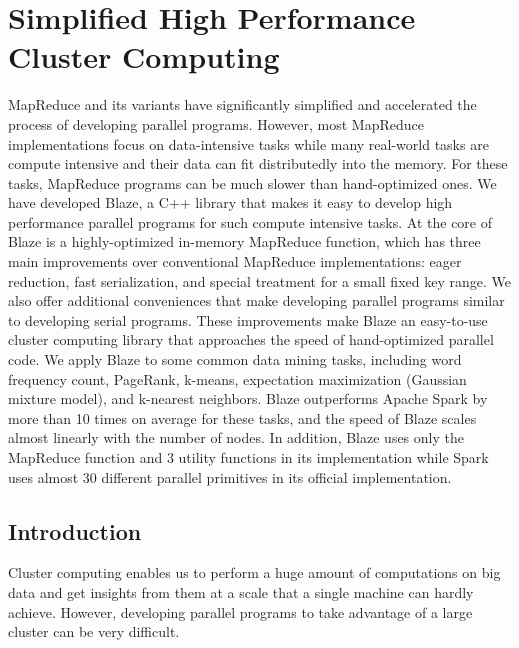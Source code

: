 \chapter{Simplified High Performance Cluster Computing}
MapReduce and its variants have significantly simplified and accelerated the process of developing parallel programs.
However, most MapReduce implementations focus on data-intensive tasks while many real-world tasks are compute intensive and their data can fit distributedly into the memory.
For these tasks, MapReduce programs can be much slower than hand-optimized ones.
We have developed Blaze, a C++ library that makes it easy to develop high performance parallel programs for such compute intensive tasks.
At the core of Blaze is a highly-optimized in-memory MapReduce function, which has three main improvements over conventional MapReduce implementations:
eager reduction, fast serialization, and special treatment for a small fixed key range.
We also offer additional conveniences that make developing parallel programs similar to developing serial programs.
These improvements make Blaze an easy-to-use cluster computing library that approaches the speed of hand-optimized parallel code.
We apply Blaze to some common data mining tasks, including word frequency count, PageRank, k-means, expectation maximization (Gaussian mixture model), and k-nearest neighbors.
Blaze outperforms Apache Spark by more than 10 times on average for these tasks, and the speed of Blaze scales almost linearly with the number of nodes.
In addition, Blaze uses only the MapReduce function and 3 utility functions in its implementation while Spark uses almost 30 different parallel primitives in its official implementation.

\section{Introduction}

Cluster computing enables us to perform a huge amount of computations on big data and get insights from them at a scale that a single machine can hardly achieve.
However, developing parallel programs to take advantage of a large cluster can be very difficult.

